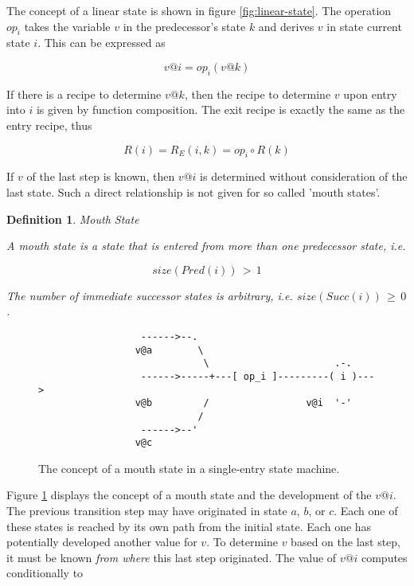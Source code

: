 \documentclass[12pt,a4paper]{scrartcl}
\newtheorem{definition}{Definition}
\begin{document}
The concept of a linear state is shown in figure \eqref{fig:linear-state}. The
operation $op_i$ takes the variable $v$ in the predecessor's state $k$ and
derives $v$ in state current state $i$. This can be expressed as 

\begin{equation} \label{eq:composition}
            v @ i = op_i(v @ k)                                         
\end{equation}

If there is a recipe to determine $v@k$, then the recipe
to determine $v$ upon entry into $i$ is given by function composition. 
The exit recipe is exactly the same as the entry recipe, thus

\begin{equation} \label{eq:composition}
    R(i) = R_E(i,k) = op_i \circ R(k)
\end{equation}

If $v$ of the last step is known, then $v@i$ is determined without
consideration of the last state.  Such a direct relationship is not given for
so called 'mouth states'.

\begin{definition} Mouth State

    A mouth state is a state that is entered from more than one predecessor
    state, i.e.

    \begin{equation}
                               size(Pred(i))\,>\,1
    \end{equation}

    The number of immediate successor states is arbitrary, i.e.
    $size(Succ(i))\,\ge\,0$.

\end{definition}
    
\begin{figure}[htbp] \leavevmode \label{fig:mouth-state}
\begin{verbatim}
                  ------>--.  
                 v@a        \ 
                             \                      .-.
                  ------>-----+---[ op_i ]---------( i )---> 
                 v@b         /                 v@i  '-'
                            /
                  ------>--'
                 v@c 

\end{verbatim}
\caption{The concept of a mouth state in a single-entry state machine.}
\end{figure}

Figure \ref{fig:mouth-state} displays the concept of a mouth state and the
development of the $v@i$. The previous transition step may have originated in
state $a$, $b$, or $c$. Each one of these states is reached by its own path from
the initial state. Each one has potentially developed another value for $v$. 
To determine $v$ based on the last step, it must be known \textit{from where}
this last step originated. The value of $v@i$ computes conditionally to
\end{document}
